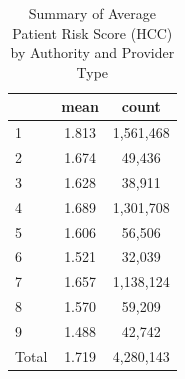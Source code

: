 \begin{table}[htbp]\centering
\def\sym#1{\ifmmode^{#1}\else\(^{#1}\)\fi}
\caption{Summary of Average Patient Risk Score (HCC) by Authority and Provider Type}
\begin{tabular}{l*{1}{cc}}
\toprule
                    &        mean&       count\\
\midrule
1                   &       1.813&   1,561,468\\
2                   &       1.674&      49,436\\
3                   &       1.628&      38,911\\
4                   &       1.689&   1,301,708\\
5                   &       1.606&      56,506\\
6                   &       1.521&      32,039\\
7                   &       1.657&   1,138,124\\
8                   &       1.570&      59,209\\
9                   &       1.488&      42,742\\
Total               &       1.719&   4,280,143\\
\bottomrule
\end{tabular}
\end{table}
